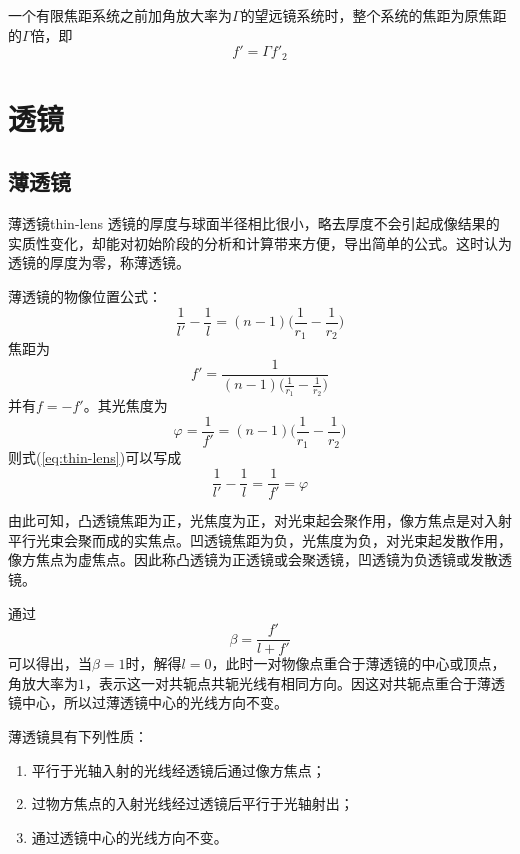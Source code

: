 \documentclass[cn,11pt]{elegantbook}
\begin{document}
一个有限焦距系统之前加角放大率为$\Gamma$的望远镜系统时，整个系统的焦距为原焦距的$\Gamma$倍，即
\begin{equation}
f'=\Gamma f'_2
\end{equation}

\section{透镜}
\subsection{薄透镜}

\begin{definition}{薄透镜}{thin-lens}
	透镜的厚度与球面半径相比很小，略去厚度不会引起成像结果的实质性变化，却能对初始阶段的分析和计算带来方便，导出简单的公式。这时认为透镜的厚度为零，称薄透镜。
\end{definition}

薄透镜的物像位置公式：
\begin{equation}
\frac{1}{l'}-\frac{1}{l}=(n-1)\bigg(\frac{1}{r_1}-\frac{1}{r_2}\bigg)
\label{eq:thin-lens}
\end{equation}
焦距为
\begin{equation}
f'=\frac{1}{(n-1)\bigg(\frac{1}{r_1}-\frac{1}{r_2}\bigg)}
\end{equation}
并有$f=-f'$。其光焦度为
\begin{equation}
\varphi=\frac{1}{f'}=(n-1)\bigg(\frac{1}{r_1}-\frac{1}{r_2}\bigg)
\end{equation}
则式(\ref{eq:thin-lens})可以写成
\begin{equation}
\frac{1}{l'}-\frac{1}{l}=\frac{1}{f'}=\varphi
\end{equation}

由此可知，凸透镜焦距为正，光焦度为正，对光束起会聚作用，像方焦点是对入射平行光束会聚而成的实焦点。凹透镜焦距为负，光焦度为负，对光束起发散作用，像方焦点为虚焦点。因此称凸透镜为正透镜或会聚透镜，凹透镜为负透镜或发散透镜。

通过
\begin{equation}
\beta=\frac{f'}{l+f'}
\end{equation}
可以得出，当$\beta=1$时，解得$l=0$，此时一对物像点重合于薄透镜的中心或顶点，角放大率为$1$，表示这一对共轭点共轭光线有相同方向。因这对共轭点重合于薄透镜中心，所以过薄透镜中心的光线方向不变。

\begin{property}
	薄透镜具有下列性质：
\begin{enumerate}
	\item 平行于光轴入射的光线经透镜后通过像方焦点；
	\item 过物方焦点的入射光线经过透镜后平行于光轴射出；
	\item 通过透镜中心的光线方向不变。
\end{enumerate}
\end{property}
\end{document}
